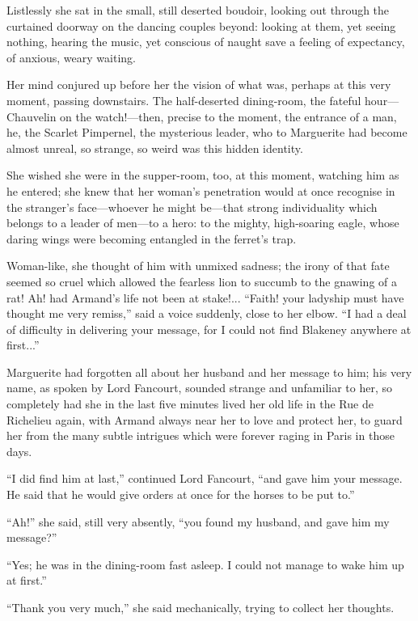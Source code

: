 \documentclass[paper=5.5in:8.5in,BCOR=7mm,twoside,DIV=calc,12pt,usegeometry,chapterprefix,endperiod,headings=big]{scrbook}
\begin{document}
Listlessly she sat in the small, still deserted boudoir, looking out through the curtained doorway on the dancing couples beyond: looking at them, yet seeing nothing, hearing the music, yet conscious of naught save a feeling of expectancy, of anxious, weary waiting.

Her mind conjured up before her the vision of what was, perhaps at this very moment, passing downstairs. The half-deserted dining-room, the fateful hour---Chauvelin on the watch!---then, precise to the moment, the entrance of a man, he, the Scarlet Pimpernel, the mysterious leader, who to Marguerite had become almost unreal, so strange, so weird was this hidden identity.

She wished she were in the supper-room, too, at this moment, watching him as he entered; she knew that her woman's penetration would at once recognise in the \newline stranger's face---whoever he might be---that strong individuality which belongs to a leader of men---to a hero: to the mighty, high-soaring eagle, whose daring wings were becoming entangled in the ferret's trap.

Woman-like, she thought of him with unmixed sadness; the irony of that fate seemed so cruel which allowed the fearless lion to succumb to the gnawing of a rat! Ah! had Armand's life not been at stake!... \enquote{Faith! your ladyship must have thought me very remiss,} said a voice suddenly, close to her elbow. \enquote{I had a deal of difficulty in delivering your message, for I could not find Blakeney anywhere at first...}

Marguerite had forgotten all about her husband and her message to him; his very name, as spoken by Lord Fancourt, sounded strange and unfamiliar to her, so completely had she in the last five minutes lived her old life in the Rue de Richelieu again, with Armand always near her to love and protect her, to guard her from the many subtle intrigues which were forever raging in Paris in those days.

\enquote{I did find him at last,} continued Lord Fancourt, \enquote{and gave him your message. He said that he would give orders at once for the horses to be put to.}

\enquote{Ah!} she said, still very absently, \enquote{you found my husband, and gave him my message?}

\enquote{Yes; he was in the dining-room fast asleep. I could not manage to wake him up at first.}

\enquote{Thank you very much,} she said mechanically, trying to collect her thoughts.
\end{document}
